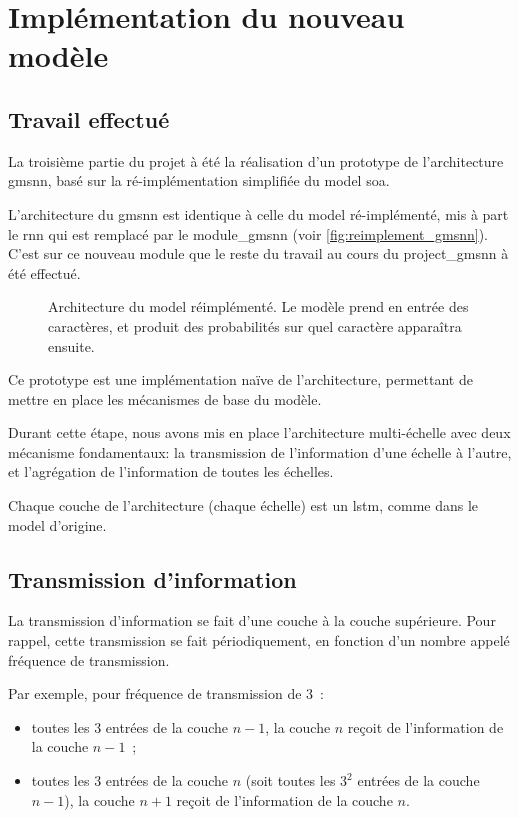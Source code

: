 \section{Implémentation du nouveau modèle}
\subsection{Travail effectué}
La troisième partie du projet à été la réalisation d'un prototype de l'architecture \gls{gmsnn}, basé sur la ré-implémentation simplifiée du \gls{model} \gls{soa}.

L'architecture du \gls{gmsnn} est identique à celle du \gls{model} ré-implémenté, mis à part le \gls{rnn} qui est remplacé par le \gls{module_gmsnn} (voir \autoref{fig:reimplement_gmsnn}). C'est sur ce nouveau module que le reste du travail au cours du \gls{project_gmsnn} à été effectué.

\begin{figure}[ht]
	\centering
	\scalebox{1}{}
	\caption[Architecture du  réimplémenté]{Architecture du \gls{model} réimplémenté. Le modèle prend en entrée des caractères, et produit des probabilités sur quel caractère apparaîtra ensuite.}\label{fig:reimplement_gmsnn}
\end{figure}

Ce prototype est une implémentation naïve de l'architecture, permettant de mettre en place les mécanismes de base du modèle.

Durant cette étape, nous avons mis en place l'architecture multi-échelle avec deux mécanisme fondamentaux: la transmission de l'information d'une échelle à l'autre, et l'agrégation de l'information de toutes les échelles.

Chaque couche de l'architecture (chaque \og échelle\fg{}) est un \gls{lstm}, comme dans le \gls{model} d'origine. \label{def:lstm_2}

\subsection{Transmission d'information}
La transmission d'information se fait d'une couche à la couche supérieure.
Pour rappel, cette transmission se fait périodiquement, en fonction d'un nombre appelé fréquence de transmission.

Par exemple, pour fréquence de transmission de $3$~: 
\begin{itemize}
	\item toutes les $3$ entrées de la couche $n-1$, la couche $n$ reçoit de l'information de la couche $n-1$~;
	\item toutes les $3$ entrées de la couche $n$ (soit toutes les $3^2$ entrées de la couche $n-1$), la couche $n+1$ reçoit de l'information de la couche $n$.
\end{itemize}

